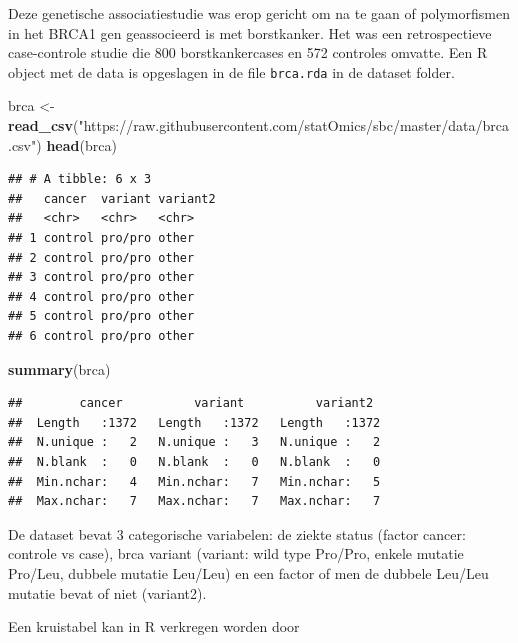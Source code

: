 \documentclass[
  12pt,dutch]{book}
\newenvironment{Shaded}{\begin{snugshade}}{\end{snugshade}}
\newcommand{\FunctionTok}[1]{\textcolor[rgb]{0.13,0.29,0.53}{\textbf{#1}}}
\newcommand{\NormalTok}[1]{#1}
\newcommand{\OtherTok}[1]{\textcolor[rgb]{0.56,0.35,0.01}{#1}}
\newcommand{\SpecialCharTok}[1]{\textcolor[rgb]{0.81,0.36,0.00}{\textbf{#1}}}
\newcommand{\StringTok}[1]{\textcolor[rgb]{0.31,0.60,0.02}{#1}}
\theoremstyle{definition}
\theoremstyle{definition}
\theoremstyle{definition}
\theoremstyle{definition}
\theoremstyle{remark}
\begin{document}
Deze genetische associatiestudie was erop gericht om na te gaan of polymorfismen in het BRCA1 gen geassocieerd is met borstkanker.
Het was een retrospectieve case-controle studie die 800 borstkankercases en 572 controles omvatte.
Een R object met de data is opgeslagen in de file \texttt{brca.rda} in de dataset folder.

\begin{Shaded}
\begin{Highlighting}[]
\NormalTok{brca }\OtherTok{\textless{}{-}} \FunctionTok{read\_csv}\NormalTok{(}\StringTok{"https://raw.githubusercontent.com/statOmics/sbc/master/data/brca.csv"}\NormalTok{)}
\FunctionTok{head}\NormalTok{(brca)}
\end{Highlighting}
\end{Shaded}

\begin{verbatim}
## # A tibble: 6 x 3
##   cancer  variant variant2
##   <chr>   <chr>   <chr>   
## 1 control pro/pro other   
## 2 control pro/pro other   
## 3 control pro/pro other   
## 4 control pro/pro other   
## 5 control pro/pro other   
## 6 control pro/pro other
\end{verbatim}

\begin{Shaded}
\begin{Highlighting}[]
\FunctionTok{summary}\NormalTok{(brca)}
\end{Highlighting}
\end{Shaded}

\begin{verbatim}
##        cancer          variant          variant2   
##  Length   :1372   Length   :1372   Length   :1372  
##  N.unique :   2   N.unique :   3   N.unique :   2  
##  N.blank  :   0   N.blank  :   0   N.blank  :   0  
##  Min.nchar:   4   Min.nchar:   7   Min.nchar:   5  
##  Max.nchar:   7   Max.nchar:   7   Max.nchar:   7
\end{verbatim}

De dataset bevat 3 categorische variabelen: de ziekte status (factor cancer: controle vs case), brca variant (variant: wild type Pro/Pro, enkele mutatie Pro/Leu, dubbele mutatie Leu/Leu) en een factor of men de dubbele Leu/Leu mutatie bevat of niet (variant2).

Een kruistabel kan in R verkregen worden door

\begin{Shaded}
\end{Shaded}
\end{document}
